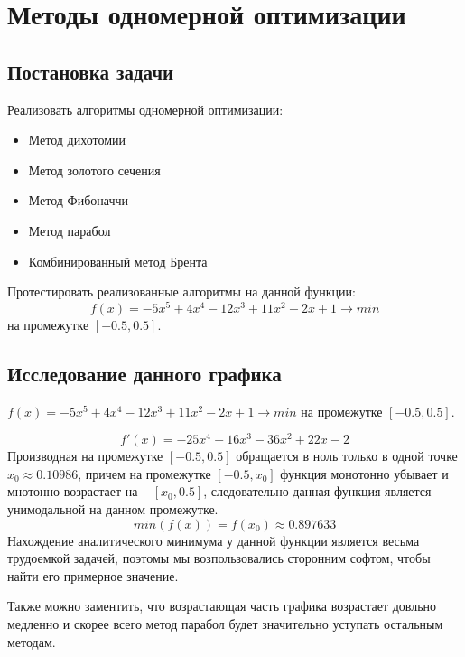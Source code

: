 \chapter{Методы одномерной оптимизации}
\section{Постановка задачи}
Реализовать алгоритмы одномерной оптимизации:

\begin{itemize}
	\item 	Метод дихотомии
	\item 	Метод золотого сечения
	\item	Метод Фибоначчи
	\item 	Метод парабол
	\item 	Комбинированный метод Брента
\end{itemize}

Протестировать реализованные алгоритмы на данной функции:
$$f(x) = -5x^5 + 4x^4 - 12x^3 + 11x^2 - 2x + 1 \rightarrow min$$ на промежутке $[-0.5, 0.5]$.

\section{Исследование данного графика}

$f(x) = -5x^5 + 4x^4 - 12x^3 + 11x^2 - 2x + 1 \rightarrow min$ на промежутке $[-0.5, 0.5]$.

$$f'(x) = -25x^4 + 16x^3 - 36x^2 + 22x - 2$$
Производная на промежутке $[-0.5, 0.5]$ обращается в ноль только в одной точке $x_0 \approx 0.10986$, причем на промежутке $[-0.5, x_0]$ функция монотонно убывает и мнотонно возрастает на -- $[x_0, 0.5]$, следовательно данная функция является унимодальной на данном промежутке.
$$min(f(x)) = f(x_0) \approx 0.897633$$
Нахождение аналитического минимума у данной функции является весьма трудоемкой задачей, поэтомы мы возпользовались сторонним софтом, чтобы найти его примерное значение.

Также можно заментить, что возрастающая часть графика возрастает довльно медленно и скорее всего 
метод парабол будет значительно уступать остальным методам.


\newpage
